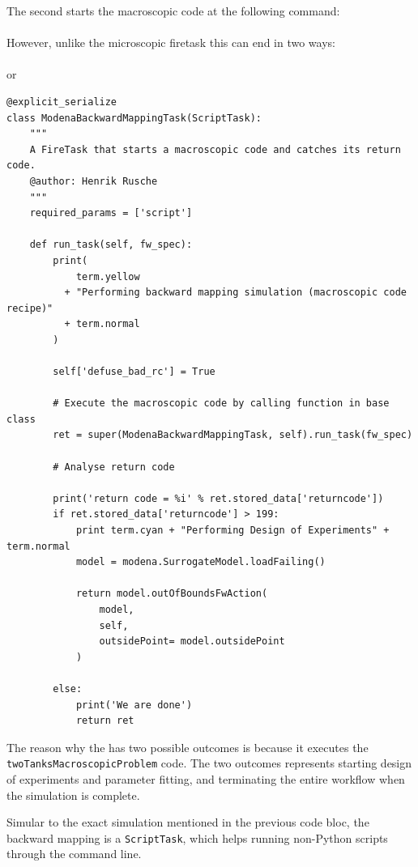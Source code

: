 %
The second {\FireTask} starts the macroscopic code at the following command:
\\ 
\\
However, unlike the microscopic firetask this can end in two ways:
\\
\\
 or
\\
%
\begin{lstlisting}[style=lstPython, firstnumber=97]
@explicit_serialize
class ModenaBackwardMappingTask(ScriptTask):
    """
    A FireTask that starts a macroscopic code and catches its return code.
    @author: Henrik Rusche
    """
    required_params = ['script']

    def run_task(self, fw_spec):
        print(
            term.yellow
          + "Performing backward mapping simulation (macroscopic code recipe)"
          + term.normal
        )

        self['defuse_bad_rc'] = True

        # Execute the macroscopic code by calling function in base class
        ret = super(ModenaBackwardMappingTask, self).run_task(fw_spec)

        # Analyse return code

        print('return code = %i' % ret.stored_data['returncode'])
        if ret.stored_data['returncode'] > 199:
            print term.cyan + "Performing Design of Experiments" + term.normal
            model = modena.SurrogateModel.loadFailing()

            return model.outOfBoundsFwAction(
                model,
                self,
                outsidePoint= model.outsidePoint
            )

        else:
            print('We are done')
            return ret
\end{lstlisting}
%
The reason why the {\ModenaBackwardMappingTask} {\FireTask} has two possible outcomes is because it executes the \texttt{twoTanksMacroscopicProblem} code. 
The two outcomes represents starting design of experiments and parameter fitting, and terminating the entire workflow when the simulation is complete. 
%
\par
%
Simular to the exact simulation mentioned in the previous code bloc, the backward mapping {\FireTask} is a \texttt{ScriptTask}, which helps running non-Python scripts through the command line. 

